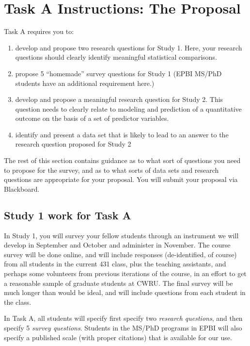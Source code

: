 \documentclass[]{book}
\providecommand{\tightlist}{%
  \setlength{\itemsep}{0pt}\setlength{\parskip}{0pt}}
\theoremstyle{definition}
\theoremstyle{definition}
\theoremstyle{definition}
\theoremstyle{remark}
\begin{document}
\hypertarget{task-a-instructions-the-proposal}{%
\chapter{Task A Instructions: The
Proposal}\label{task-a-instructions-the-proposal}}

Task A requires you to:

\begin{enumerate}
\def\labelenumi{\arabic{enumi}.}
\tightlist
\item
  develop and propose two research questions for Study 1. Here, your
  research questions should clearly identify meaningful statistical
  comparisons.
\item
  propose 5 ``homemade'' survey questions for Study 1 (EPBI MS/PhD
  students have an additional requirement here.)
\item
  develop and propose a meaningful research question for Study 2. This
  question needs to clearly relate to modeling and prediction of a
  quantitative outcome on the basis of a set of predictor variables.
\item
  identify and present a data set that is likely to lead to an answer to
  the research question proposed for Study 2
\end{enumerate}

The rest of this section contains guidance as to what sort of questions
you need to propose for the survey, and as to what sorts of data sets
and research questions are appropriate for your proposal. You will
submit your proposal via Blackboard.

\hypertarget{study-1-work-for-task-a}{%
\section{Study 1 work for Task A}\label{study-1-work-for-task-a}}

In Study 1, you will survey your fellow students through an instrument
we will develop in September and October and administer in November. The
course survey will be done online, and will include responses
(de-identified, of course) from all students in the current 431 class,
plus the teaching assistants, and perhaps some volunteers from previous
iterations of the course, in an effort to get a reasonable sample of
graduate students at CWRU. The final survey will be much longer than
would be ideal, and will include questions from each student in the
class.

In Task A, all students will specify first specify two \emph{research
questions}, and then specify 5 \emph{survey questions}. Students in the
MS/PhD programs in EPBI will also specify a published scale (with proper
citations) that is available for our use.
\end{document}
